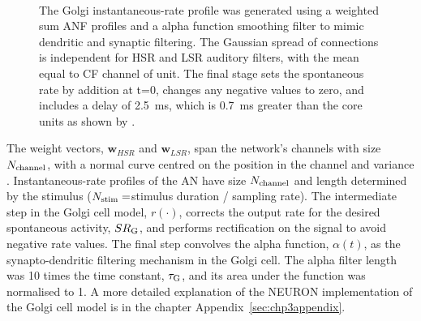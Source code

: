 \begin{figure}[h!]
  \centering
  \resizebox{0.9\textwidth}{!}{}\\
  \caption{The Golgi instantaneous-rate profile was generated using a weighted
    sum ANF profiles and a alpha function smoothing filter to mimic dendritic
    and synaptic filtering. The Gaussian spread of connections is independent
    for HSR and LSR auditory filters, with the mean equal to CF channel of
    unit. The final stage sets the spontaneous rate by addition at t=0, changes
    any negative values to zero, and includes a delay of 2.5~ms, which is 0.7~ms
    greater than the core \VCN units as shown by \citet{GhoshalKim:1997}.}
  \label{fig:GolgiDiagram}
\end{figure}




The weight vectors, $\mathbf{w}_{HSR}$ and $\mathbf{w}_{LSR}$, span the
network's channels with size $N_{\rm channel}$, with a normal curve centred on
the position in the channel and variance \sANFGLG. Instantaneous-rate profiles
of the AN have size $N_{\rm channel}$ and length determined by the stimulus
($N_{\rm stim}=$stimulus duration / sampling rate).  The intermediate step in
the Golgi cell model, $r(\cdot)$, corrects the output rate for the desired
spontaneous activity, $\protect SR_{\rm G}$, and performs rectification on the signal to avoid
negative rate values.   The final step convolves the alpha function, $\alpha(t)$, as the
synapto-dendritic filtering mechanism in the Golgi cell. The
alpha filter length was 10 times the time constant, $\protect\tau_{\rm G}$, and its area under
the function was normalised to 1.  A more detailed explanation of the NEURON
implementation of the Golgi cell model is in the chapter
Appendix~\ref{sec:chp3appendix}.  %



